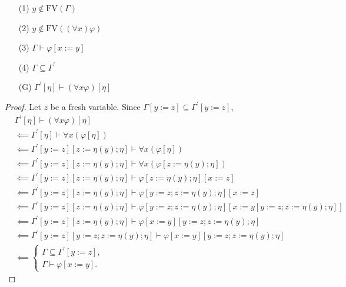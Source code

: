\documentclass[12pt]{paper}
\begin{document}
\begin{enumerate}
\item [(1)] $y \notin \mathrm{FV} \left( \Gamma \right)$
\item [(2)] $y \notin \mathrm{FV} \left( \left( \forall x \right) \varphi \right)$
\item [(3)] $\Gamma \vdash \varphi \left[ x := y \right]$
\item [(4)] $\Gamma \subseteq \Gamma^{\prime}$
\item [(G)] $\Gamma^{\prime} \left[ \eta \right] \vdash \left( \forall x \varphi \right) \left[ \eta \right]$
\end{enumerate}
\begin{proof} Let $z$ be a fresh variable. Since $\Gamma \left[ y := z \right] \subseteq \Gamma^{\prime} \left[ y := z \right]$,
\begin{align*}
& \Gamma^{\prime} \left[ \eta \right] \vdash \left( \forall x \varphi \right) \left[ \eta \right] \\
& \impliedby \Gamma^{\prime} \left[ \eta \right] \vdash \forall x \left( \varphi \left[ \eta \right] \right) \\
& \impliedby \Gamma^{\prime} \left[ y := z \right] \left[ z := \eta \left( y \right) ; \eta \right] \vdash \forall x \left( \varphi \left[ \eta \right] \right) \\
& \impliedby \Gamma^{\prime} \left[ y := z \right] \left[ z := \eta \left( y \right) ; \eta \right] \vdash \forall x \left( \varphi \left[ z := \eta \left( y \right) ; \eta \right] \right) \\
& \impliedby \Gamma^{\prime} \left[ y := z \right] \left[ z := \eta \left( y \right) ; \eta \right] \vdash \varphi \left[ z := \eta \left( y \right) ; \eta \right] \left[ x := z \right] \\
& \impliedby \Gamma^{\prime} \left[ y := z \right] \left[ z := \eta \left( y \right) ; \eta \right] \vdash \varphi \left[ y := z ; z := \eta \left( y \right) ; \eta \right] \left[ x := z \right] \\
& \impliedby \Gamma^{\prime} \left[ y := z \right] \left[ z := \eta \left( y \right) ; \eta \right] \vdash \varphi \left[ y := z ; z := \eta \left( y \right) ; \eta \right] \left[ x := y \left[ y := z ; z := \eta \left( y \right) ; \eta \right] \right] \\
& \impliedby \Gamma^{\prime} \left[ y := z \right] \left[ z := \eta \left( y \right) ; \eta \right] \vdash \varphi \left[ x := y \right] \left[ y := z ; z := \eta \left( y \right) ; \eta \right] \\
& \impliedby \Gamma^{\prime} \left[ y := z \right] \left[ y := z ; z := \eta \left( y \right) ; \eta \right] \vdash \varphi \left[ x := y \right] \left[ y := z ; z := \eta \left( y \right) ; \eta \right] \\
& \impliedby
\begin{cases}
\Gamma \subseteq \Gamma^{\prime} \left[ y := z \right] , \\
\Gamma \vdash \varphi \left[ x := y \right] .
\end{cases}
\end{align*}
\end{proof}
\end{document}
